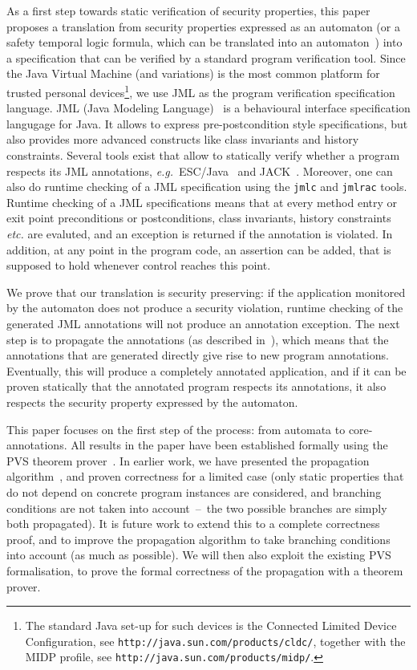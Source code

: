 As a first step towards static verification of security properties,
this paper proposes a translation from security properties expressed
as an automaton (or a safety temporal logic formula, which can be
translated into an automaton~\cite{Wolper01}) into a specification that
can be verified by a standard program verification tool. Since the
Java Virtual Machine (and variations) is the most common platform for
trusted personal devices\footnote{The standard Java set-up for such
devices is the Connected Limited Device Configuration, see
\texttt{http://java.sun.com/products/cldc/}, together with the MIDP
profile, see
\texttt{http://java.sun.com/products/midp/}.}, we use JML as the
program verification specification language.  JML (Java Modeling
Language)~\cite{LeavensPCCRCK05} is a behavioural interface specification
langugage for Java. It allows to express pre-postcondition style
specifications, but also provides more advanced constructs like class
invariants and history constraints. Several tools exist that allow to
statically verify whether a program respects its JML annotations,
\emph{e.g.}\ ESC/Java~\cite{CokK04} and
JACK~\cite{BartheBCGHMPPSV06}. Moreover, one can also do
runtime checking of a JML specification using the
\texttt{jmlc} and
\texttt{jmlrac} tools. Runtime checking of a JML specifications means
that at every method entry or exit point preconditions or
postconditions, class invariants, history constraints \emph{etc.} are
evaluted, and an exception is returned if the annotation is
violated. In addition, at any point in the program code, an assertion
can be added, that is supposed to hold whenever control reaches this
point.

We prove that our translation is security preserving: if the
application monitored by the automaton does not produce a security
violation, runtime checking of the generated JML annotations will 
not produce an annotation exception. The next step is to
propagate the annotations (as described
in~\cite{PavlovaBBHL04}), which means that the annotations that
are generated directly give rise to new program
annotations. Eventually, this will produce a completely annotated
application, and if it can be proven statically that the annotated
program respects its annotations, it also respects the security
property expressed by the automaton.

This paper focuses on the first step of the process: from automata to
core-annotations. All results in the paper have been established
formally using the PVS theorem prover~\cite{OwreRRSS96}. In earlier work,
we have presented the propagation
algorithm~\cite{PavlovaBBHL04}, and proven correctness for a
limited case (only static properties that do not depend on concrete
program instances are considered, and branching conditions are not
taken into account~--~the two possible branches are simply both
propagated). It is future work to extend this to a complete
correctness proof, and to improve the propagation algorithm to take
branching conditions into account (as much as possible). We will then
also exploit the existing PVS formalisation, to prove the formal
correctness of the propagation with a theorem prover.

